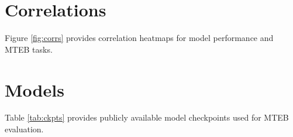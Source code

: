 \documentclass[11pt]{article}
\begin{document}
\section{Correlations}
\label{sec:corr}

Figure \ref{fig:corrs} provides correlation heatmaps for model performance and MTEB tasks.

\begin{figure*}
    \centering
    \qquad
    \caption{Pearson correlations across model and task results. \textbf{Left:} Size variants of the same architecture show high correlations. \textbf{Right:} Performance on clustering and reranking correlates strongest, while summarization and classification show weaker correlation with other tasks.}
    \label{fig:corrs}
\end{figure*}

\section{Models}
\label{sec:appmodels}

Table \ref{tab:ckpts} provides publicly available model checkpoints used for MTEB evaluation.
\end{document}
